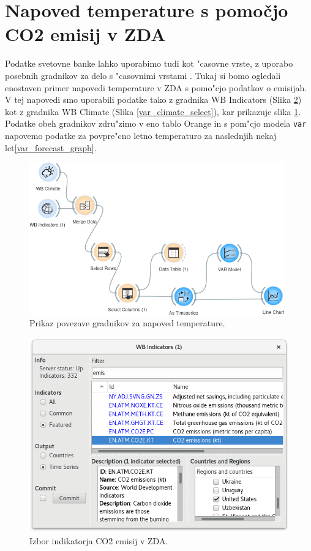 \section{Napoved temperature s pomočjo CO2 emisij v ZDA}


Podatke svetovne banke lahko uporabimo tudi kot "casovne vrste, z uporabo
posebnih gradnikov za delo s "casovnimi vrstami \cite{time_series}. Tukaj si
bomo ogledali enostaven primer napovedi temperature v ZDA s pomo"cjo podatkov o
emisijah. V tej napovedi smo uporabili podatke tako z gradnika WB Indicators
(Slika \ref{var_indicator_select})
kot z gradnika WB Climate (Slika \ref{var_climate_select}), 
kar prikazuje slika \ref{var_setup}. Podatke obeh gradnikov zdru"zimo v eno 
tablo Orange in s pom"cjo modela \verb|var| napovemo podatke za povpre"cno 
letno temperaturo za naslednjih nekaj let\ref{var_forecast_graph}.

\begin{figure}
\begin{center}
\includegraphics[width=11cm]{pic/var_setup.png}
\end{center}
\caption{Prikaz povezave gradnikov za napoved temperature.}
\label{var_setup}
\end{figure} 


\begin{figure}
\begin{center}
\includegraphics[width=12cm]{pic/var_indicator_select.png}
\end{center}
\caption{Izbor indikatorja CO2 emisij v ZDA.}
\label{var_indicator_select}
\end{figure} 

